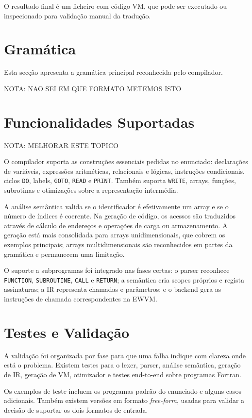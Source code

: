 \documentclass[11pt,a4paper]{report}
\begin{document}
O resultado final é um ficheiro com código VM, que pode ser executado ou inspecionado para validação manual da tradução. 

\section{Gramática}

Esta secção apresenta a gramática principal reconhecida pelo compilador. 

NOTA: NAO SEI EM QUE FORMATO METEMOS ISTO

\section{Funcionalidades Suportadas}

NOTA: MELHORAR ESTE TOPICO

O compilador suporta as construções essenciais pedidas no enunciado: declarações de variáveis, expressões aritméticas, relacionais e lógicas, instruções condicionais, ciclos \texttt{DO}, labels, \texttt{GOTO}, \texttt{READ} e \texttt{PRINT}. Também suporta \texttt{WRITE}, arrays, funções, subrotinas e otimizações sobre a representação intermédia.

 A análise semântica valida se o identificador é efetivamente um array e se o número de índices é coerente. Na geração de código, os acessos são traduzidos através de cálculo de endereços e operações de carga ou armazenamento. A geração está mais consolidada para arrays unidimensionais, que cobrem os exemplos principais; arrays multidimensionais são reconhecidos em partes da gramática e permanecem uma limitação.

O suporte a subprogramas foi integrado nas fases certas: o parser reconhece \texttt{FUNCTION}, \texttt{SUBROUTINE}, \texttt{CALL} e \texttt{RETURN}; a semântica cria scopes próprios e regista assinaturas; a IR representa chamadas e parâmetros; e o backend gera as instruções de chamada correspondentes na EWVM.


\section{Testes e Validação}

A validação foi organizada por fase para que uma falha indique com clareza onde está o problema. Existem testes para o lexer, parser, análise semântica, geração de IR, geração de VM, otimizador e testes end-to-end sobre programas Fortran.

Os exemplos de teste incluem os programas padrão do enunciado e alguns casos adicionais. Também existem versões em formato \textit{free-form}, usadas para validar a decisão de suportar os dois formatos de entrada.
\end{document}
